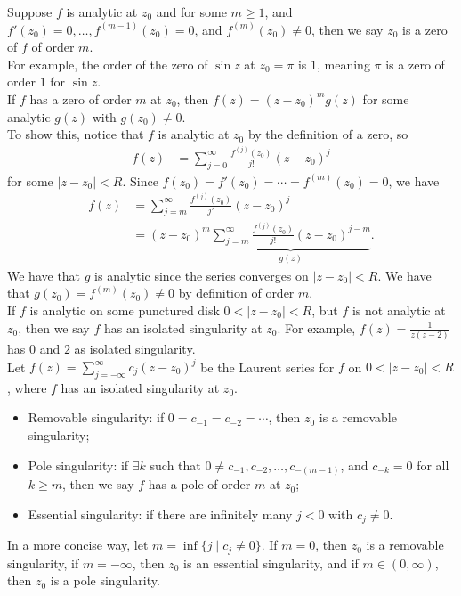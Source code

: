 \documentclass[10pt]{extarticle}
\begin{document}
  Suppose $f$ is analytic at $z_0$ and for some $m\geq 1$, and $f'(z_0) = 0,\dots,f^{(m-1)}(z_0) = 0$, and $f^{(m)}(z_0)\neq 0$, then we say $z_0$ is a zero of $f$ of order $m$.\\

  For example, the order of the zero of $\sin z$ at $z_0 = \pi$ is $1$, meaning $\pi$ is a zero of order $1$ for $\sin z$.\\

  If $f$ has a zero of order $m$ at $z_0$, then $f(z) = (z-z_0)^mg(z)$ for some analytic $g(z)$ with $g(z_0)\neq 0$.\\

  To show this, notice that $f$ is analytic at $z_0$ by the definition of a zero, so
  \begin{align*}
    f(z) &= \sum_{j=0}^{\infty}\frac{f^{(j)}(z_0)}{j!}(z-z_0)^j
  \end{align*}
  for some $|z-z_0| < R$. Since $f(z_0)=f'(z_0)=\cdots=f^{(m)}(z_0) = 0$, we have
  \begin{align*}
    f(z) &= \sum_{j=m}^{\infty}\frac{f^{(j)}(z_0)}{j'}(z-z_0)^j\\
         &= (z-z_0)^m\underbrace{\sum_{j=m}^{\infty}\frac{f^{(j)}(z_0)}{j!}(z-z_0)^{j-m}}_{g(z)}.
  \end{align*}
  We have that $g$ is analytic since the series converges on $|z-z_0| < R$. We have that $g(z_0) = f^{(m)}(z_0) \neq 0$ by definition of order $m$.\\

  If $f$ is analytic on some punctured disk $0 < |z-z_0| < R$, but $f$ is not analytic at $z_0$, then we say $f$ has an isolated singularity at $z_0$. For example, $f(z) = \frac{1}{z(z-2)}$ has $0$ and $2$ as isolated singularity.\\

  Let $f(z) = \sum_{j=-\infty}^{\infty}c_j(z-z_0)^j$ be the Laurent series for $f$ on $0 < |z-z_0| < R$, where $f$ has an isolated singularity at $z_0$.
  \begin{itemize}
    \item Removable singularity: if $0 = c_{-1} = c_{-2} = \cdots$, then $z_0$ is a removable singularity;
    \item Pole singularity: if $\exists k$ such that $0 \neq c_{-1},c_{-2},\dots, c_{-(m-1)}$, and $c_{-k} = 0$ for all $k\geq m$, then we say $f$ has a pole of order $m$ at $z_0$;
    \item Essential singularity: if there are infinitely many $j < 0$ with $c_j \neq 0$.
  \end{itemize}
  In a more concise way, let $m = \inf\{j\mid c_j\neq 0\}$. If $m = 0$, then $z_0$ is a removable singularity, if $m = -\infty$, then $z_0$ is an essential singularity, and if $m \in (0,\infty)$, then $z_0$ is a pole singularity.\\
\end{document}
